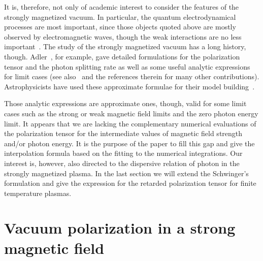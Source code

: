 It is, therefore, not only of academic interest to consider the features of
the strongly magnetized vacuum. In particular, the quantum electrodynamical
processes are most important, since those objects quoted above are 
mostly observed by electromagnetic waves, though the weak interactions 
are no less important~\cite{ks,hl}. The study of the strongly magnetized
vacuum has a long history, though. Adler~\cite{ad}, for example, gave detailed
formulations for the polarization tensor and the photon splitting rate 
as well as some useful analytic expressions for limit cases (see
also~\cite{lai,melrose_stoneham,mz} and the references therein for many other 
contributions). Astrophysicists have used these approximate formulae 
for their model building~\cite{td,bm}.

Those analytic expressions are approximate ones, though, valid for some
limit cases such as the strong or weak magnetic field limits and the 
zero photon energy limit. It appears that we are lacking the
complementary numerical evaluations of the polarization tensor for 
the intermediate values of magnetic field strength and/or photon
energy. It is the purpose of the paper to fill this gap
and give the interpolation formula based on the fitting to the numerical
integrations. Our interest is, however, also directed to the dispersive
relation of photon in the strongly magnetized plasma. In the last 
section we will extend the Schwinger's formulation and give the 
expression for the retarded polarization tensor for finite 
temperature plasmas.

\section{Vacuum polarization in a strong magnetic field}
\label{sec:Vacuum_polarization}

